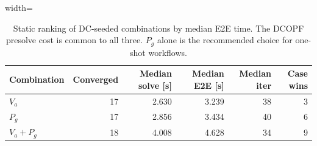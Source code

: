 \begin{table}[!t]
\centering
\caption{Static ranking of DC-seeded combinations by median E2E time. The DCOPF presolve cost is common to all three. $P_g$ alone is the recommended choice for one-shot workflows.}
\label{tab:combo_rank_dc}
\small
\setlength{\tabcolsep}{6pt}
\begin{adjustbox}{width=\columnwidth}
\begin{tabular}{lrrrrr}
\toprule
Combination & Converged & Median solve [s] & Median E2E [s] & Median iter & Case wins \\
\midrule
$V_a$ & 17 & 2.630 & 3.239 & 38 & 3 \\
$P_g$ & 17 & 2.856 & 3.434 & 40 & 6 \\
$V_a{+}P_g$ & 18 & 4.008 & 4.628 & 34 & 9 \\
\bottomrule
\end{tabular}
\end{adjustbox}
\end{table}